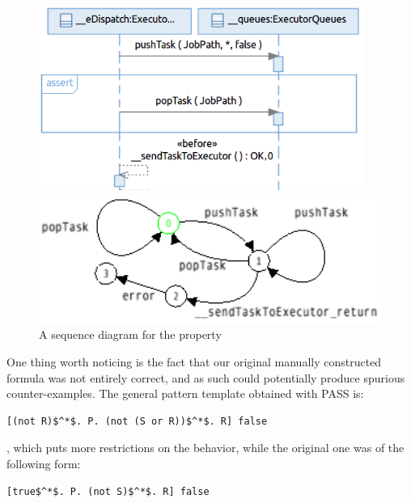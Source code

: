 \documentclass[letter]{llncs}
\begin{document}
\begin{figure}[!b]
 \centering
\begin{minipage}[!t]{0.5\linewidth}
\includegraphics[width=0.95\textwidth]{./SDProperty.png}%
\caption{A sequence diagram for the property}
\label{fig:SDProperty}
\end{minipage}%
\begin{minipage}[t]{0.5\linewidth}
\includegraphics[width=1.0\textwidth]{./PropertyAutomaton.png}%
%
\end{minipage}
\end{figure}
One thing worth noticing is the fact that our original manually constructed formula was not entirely correct, and as such could potentially produce spurious counter-examples. 
The general pattern template obtained with PASS is:
\begin{lstlisting}[basicstyle=\sffamily\fontsize{7}{7}\selectfont,showspaces=false,showstringspaces=false,showtabs=false,mathescape]
[(not R)$^*$. P. (not (S or R))$^*$. R] false
\end{lstlisting} 
, which puts more restrictions on the behavior, while the original one was of the following form:
\begin{lstlisting}[basicstyle=\sffamily\fontsize{7}{7}\selectfont,showspaces=false,showstringspaces=false,showtabs=false,mathescape]
[true$^*$. P. (not S)$^*$. R] false
\end{lstlisting} 
    
\end{document}

